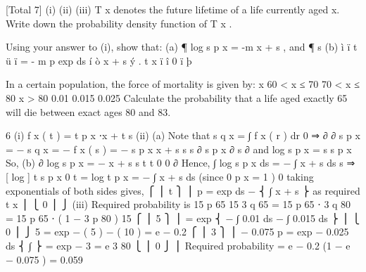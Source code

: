 \documentclass[a4paper,12pt]{article}
\begin{document}
[Total 7]
(i)
(ii)
(iii)
T x denotes the future lifetime of a life currently aged x. Write down the
probability density function of T x .

Using your answer to (i), show that:
(a) ¶
log s p x = -m x + s , and
¶ s
(b) ì ï t
ü ï
=
-
m
p
exp
ds
í ò x + s
ý .
t x
ï î 0
ï þ

In a certain population, the force of mortality is given by:
\mu x
60 < x ≤ 70
70 < x ≤ 80
x > 80
0.01
0.015
0.025
Calculate the probability that a life aged exactly 65 will die between exact
ages 80 and 83.



6
(i)
f x ( t ) = t p x ⋅\mu x + t
s
(ii)
(a)
Note that s q x = ∫ f x ( r ) dr
0
⇒
∂
∂
s p x = −
s q x = − f x ( s ) = − s p x \mu x + s
\frac{\partial}{\partial } s
\frac{\partial}{\partial } s
∂
s p x
∂
s
∂
and
log s p x =
\frac{\partial}{\partial } s
s p x
So,
(b)
∂
log s p x = − \mu x + s
\frac{\partial}{\partial } s
t t
0 0
∂
Hence, ∫ log s p x ds = − ∫ \mu x + s ds
\frac{\partial}{\partial } s
⇒ [ log
]
t
s p x 0
t
= log t p x = − ∫ \mu x + s ds (since 0 p x = 1 )
0
taking exponentials of both sides gives,
⎧ ⎪ t
⎫ ⎪
p
=
exp
ds
−
\mu
⎨ ∫ x + s ⎬ as required
t x
⎪ ⎩ 0
⎪ ⎭
(iii)
Required probability is
15 p 65
15 3 q 65
=
15 p 65 ⋅ 3 q 80
=
15 p 65 ⋅
( 1 − 3 p 80 )
15
⎧ ⎪ 5
⎫ ⎪
= exp ⎨ − ∫ 0.01 ds − ∫ 0.015 ds ⎬
⎪ ⎩ 0
⎪ ⎭
5
= exp { − ( 5  ) − ( 10  ) } = e − 0.2
⎧ ⎪ 3
⎫ ⎪
− 0.075
p
=
exp
−
0.025
ds
⎨ ∫
⎬ = exp { − 3  } = e
3 80
⎩ ⎪ 0
⎭ ⎪
Required probability = e − 0.2 (1 − e − 0.075 ) = 0.059
\end{document}

